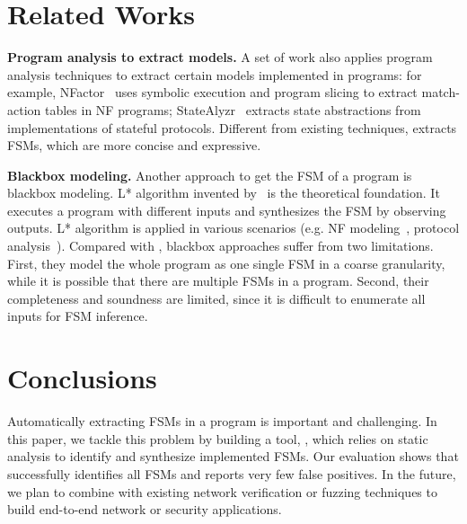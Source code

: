 \section{Related Works}
\label{sec:related}

\noindent\textbf{Program analysis to extract models.}
A set of work also applies program analysis techniques
to extract certain models implemented in programs:
for example, NFactor~\cite{wu2016automatic}
uses symbolic execution and program slicing to extract match-action
tables in NF programs;
StateAlyzr~\cite{khalid2016paving} extracts state abstractions
from implementations of stateful protocols.
Different from existing techniques, \Tool{} extracts FSMs,
which are more concise and expressive.

\noindent\textbf{Blackbox modeling.}
Another approach to get the FSM of a program is blackbox modeling.
L* algorithm invented by~\citet{angluin1987learning}
is the theoretical foundation.
It executes a program with different inputs and
synthesizes the FSM by observing outputs.
L* algorithm is applied in various scenarios
(e.g. NF modeling~\cite{moon2019alembic},
protocol analysis~\cite{cho2011mace}).
Compared with \Tool{}, blackbox approaches suffer from two limitations.
First, they model the whole program as one single FSM in a coarse granularity,
while it is possible that there are multiple FSMs in a program.
Second, their completeness and soundness are limited,
since it is difficult to enumerate all inputs for
FSM inference.



\section{Conclusions}

Automatically extracting FSMs in a program is important
and challenging.
In this paper, we tackle this problem by building a tool, \Tool{},
which relies on static analysis to identify and synthesize implemented FSMs.
Our evaluation shows that \Tool{} successfully identifies all FSMs and
reports very few false positives.
In the future, we plan to combine \Tool{} with existing network verification
or fuzzing techniques to build end-to-end network or security applications.







